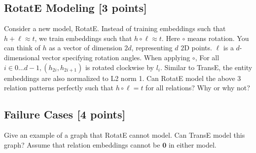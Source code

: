 \subsection{RotatE Modeling [3 points]}
Consider a new model, RotatE. Instead of training embeddings such that $h+\ell \approx t$, we train embeddings such that $h \circ \ell \approx t$. Here $\circ$ means rotation. You can think of $h$ as a vector of dimension $2 d$, representing $d$ $2 \mathrm{D}$ points. $\ell$ is a $d$-dimensional vector specifying rotation angles. When applying $\circ$, For all $i \in 0 \ldots d-1, \left(h_{2 i}, h_{2 i+1}\right)$ is rotated clockwise by $l_i$. Similar to TransE, the entity embeddings are also normalized to L2 norm 1. Can RotatE model the above 3 relation patterns perfectly such that $h \circ \ell = t$ for all relations? Why or why not?


\subsection{Failure Cases [4 points]}
Give an example of a graph that RotatE cannot model. Can TransE model this graph? Assume that relation embeddings cannot be $\mathbf{0}$ in either model.

\Solution{}